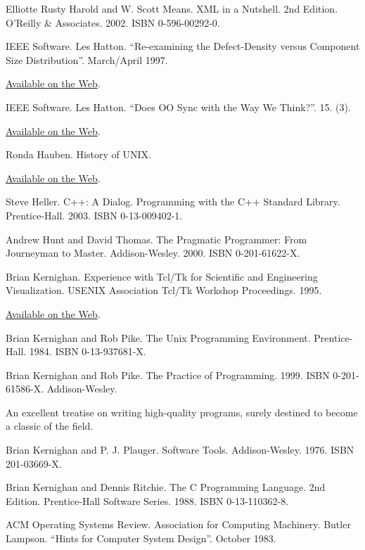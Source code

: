 \documentclass[12pt,oneside]{ctexbook}
\begin{document}
\begin{common-format}
\begin{thebibliography}{9}
 Elliotte Rusty Harold and W. Scott Means. XML in a Nutshell. 2nd Edition. O'Reilly \&{} Associates. 2002. ISBN 0-596-00292-0.

 IEEE Software. Les Hatton. “Re-examining the Defect-Density versus Component Size Distribution”. March/April 1997.

\href{http://www.cs.ukc.ac.uk/people/staff/lh8/pubs/pubis697/Ubend_IS697.pdf.gz}{Available on the Web}.

 IEEE Software. Les Hatton. “Does OO Sync with the Way We Think?”. 15. (3).

\href{http://www.cs.ukc.ac.uk/people/staff/lh8/pubs/pubis698/OO_IS698.pdf.gz}{Available on the Web}.

 Ronda Hauben. History of UNIX.

\href{http://www.dei.isep.ipp.pt/docs/unix.html}{Available on the Web}.

 Steve Heller. C++: A Dialog. Programming with the C++ Standard Library. Prentice-Hall. 2003. ISBN 0-13-009402-1.

 Andrew Hunt and David Thomas. The Pragmatic Programmer: From Journeyman to Master. Addison-Wesley. 2000. ISBN 0-201-61622-X.

 Brian Kernighan. Experience with Tcl/Tk for Scientific and Engineering Visualization. USENIX Association Tcl/Tk Workshop Proceedings. 1995.

\href{http://www.usenix.org/publications/library/proceedings/tcl95/full_papers/kernighan.txt}{Available on the Web}.

 Brian Kernighan and Rob Pike. The Unix Programming Environment. Prentice-Hall. 1984. ISBN 0-13-937681-X.

 Brian Kernighan and Rob Pike. The Practice of Programming. 1999. ISBN 0-201-61586-X. Addison-Wesley.

An excellent treatise on writing high-quality programs, surely destined to become a classic of the field.

 Brian Kernighan and P. J. Plauger. Software Tools. Addison-Wesley. 1976. ISBN 201-03669-X.

 Brian Kernighan and Dennis Ritchie. The C Programming Language. 2nd Edition. Prentice-Hall Software Series. 1988. ISBN 0-13-110362-8.

 ACM Operating Systems Review. Association for Computing Machinery. Butler Lampson. “Hints for Computer System Design”. October 1983.


\end{thebibliography}
\end{common-format}
\end{document}
